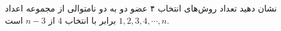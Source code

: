 \p
نشان دهید تعداد روش‌های انتخاب ۴ عضو دو به دو  نامتوالی از مجموعه اعداد
$1, 2, 3, 4, \cdots, n$
			 برابر با 
			 انتخاب
			  $4$
			  از
			  $n-3$
			  است.